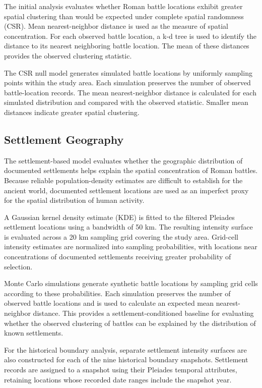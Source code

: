 \documentclass[
  letterpaper,
  DIV=11,
  numbers=noendperiod]{scrartcl}
\begin{document}
The initial analysis evaluates whether Roman battle locations exhibit
greater spatial clustering than would be expected under complete spatial
randomness (CSR). Mean nearest-neighbor distance is used as the measure
of spatial concentration. For each observed battle location, a k-d tree
is used to identify the distance to its nearest neighboring battle
location. The mean of these distances provides the observed clustering
statistic.

The CSR null model generates simulated battle locations by uniformly
sampling points within the study area. Each simulation preserves the
number of observed battle-location records. The mean nearest-neighbor
distance is calculated for each simulated distribution and compared with
the observed statistic. Smaller mean distances indicate greater spatial
clustering.

\subsection{Settlement Geography}\label{settlement-geography}

The settlement-based model evaluates whether the geographic distribution
of documented settlements helps explain the spatial concentration of
Roman battles. Because reliable population-density estimates are
difficult to establish for the ancient world, documented settlement
locations are used as an imperfect proxy for the spatial distribution of
human activity.

A Gaussian kernel density estimate (KDE) is fitted to the filtered
Pleiades settlement locations using a bandwidth of 50 km. The resulting
intensity surface is evaluated across a 20 km sampling grid covering the
study area. Grid-cell intensity estimates are normalized into sampling
probabilities, with locations near concentrations of documented
settlements receiving greater probability of selection.

Monte Carlo simulations generate synthetic battle locations by sampling
grid cells according to these probabilities. Each simulation preserves
the number of observed battle locations and is used to calculate an
expected mean nearest-neighbor distance. This provides a
settlement-conditioned baseline for evaluating whether the observed
clustering of battles can be explained by the distribution of known
settlements.

For the historical boundary analysis, separate settlement intensity
surfaces are also constructed for each of the nine historical boundary
snapshots. Settlement records are assigned to a snapshot using their
Pleiades temporal attributes, retaining locations whose recorded date
ranges include the snapshot year.
\end{document}
